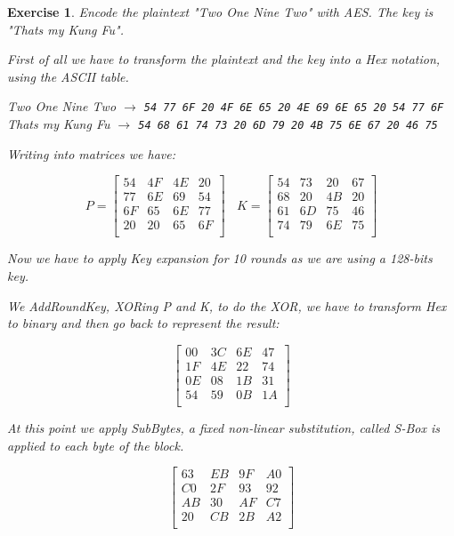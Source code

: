 \documentclass[a4paper, 12pt]{report}
\newtheorem{exercise}{\textbf{Exercise}}
\begin{document}
\begin{exercise}
	Encode the plaintext "Two One Nine Two" with AES. The key is "Thats my Kung Fu".
	
	First of all we have to transform the plaintext and the key into a Hex notation, using the ASCII table.
	
	Two One Nine Two $\rightarrow$ \texttt{54 77 6F 20 4F 6E 65 20 4E 69 6E 65 20 54 77 6F}\\
	Thats my Kung Fu $\rightarrow$ \texttt{54 68 61 74 73 20 6D 79 20 4B 75 6E 67 20 46 75}
	
	Writing into matrices we have:
	\begin{center}
		\[P=\left[ \begin{array}{cccc}
			54 & 4F & 4E & 20 \\
			77 & 6E & 69 & 54 \\
			6F & 65 & 6E & 77 \\
			20 & 20 & 65 & 6F \\
		\end{array} \right] \ \ \ \ 
		K=
		\left[ \begin{array}{cccc}
			54 & 73 & 20 & 67 \\
			68 & 20 & 4B & 20 \\
			61 & 6D & 75 & 46 \\
			74 & 79 & 6E & 75 \\
		\end{array} \right]
		\]
	\end{center}

	Now we have to apply Key expansion for 10 rounds as we are using a 128-bits key.
	
	We AddRoundKey, XORing P and K, to do the XOR, we have to transform Hex to binary and then go back to represent the result:
	\begin{center}
		\[\left[ \begin{array}{cccc}
		00 & 3C & 6E & 47 \\
		1F & 4E & 22 & 74 \\
		0E & 08 & 1B & 31 \\
		54 & 59 & 0B & 1A \\
		\end{array} \right]\]
	\end{center}
	At this point we apply SubBytes, a fixed non-linear substitution, called S-Box is applied to each byte of the block.
	\begin{center}
		\[\left[ \begin{array}{cccc}
		63 & EB & 9F & A0 \\
		C0 & 2F & 93 & 92 \\
		AB & 30 & AF & C7 \\
		20 & CB & 2B & A2 \\
		\end{array} \right]\]
	\end{center}


\end{exercise}
\end{document}
